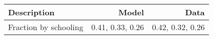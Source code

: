 \begin{tabular}{lrr}
\hline
Description & Model  & Data  \\ 
\hline
Fraction by schooling & 0.41, 0.33, 0.26  & 0.42, 0.32, 0.26  \\ 
\hline
\end{tabular}%
